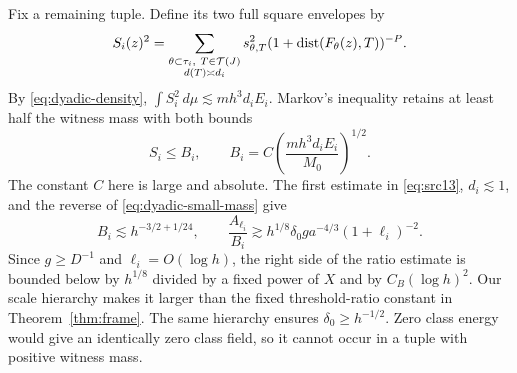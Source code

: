 Fix a remaining tuple.  Define its two full square envelopes by
\[
 S_i(z)^2=
 \sum_{\substack{\theta\subset\tau_i,\ T\in\mathcal T(J)\\
                         d(T)\asymp d_i}}
 s_{\theta,T}^2(1+\operatorname{dist}(F_\theta(z),T))^{-P}.
\]
By \eqref{eq:dyadic-density},
$\int S_i^2\,d\mu\lesssim mh^3d_iE_i$.  Markov's inequality retains
at least half the witness mass with both bounds
\begin{equation}\label{eq:dyadic-markov}
 S_i\leq B_i,
 \qquad B_i=C\left(\frac{mh^3d_iE_i}{M_0}\right)^{1/2}.
\end{equation}
The constant $C$ here is large and absolute.  The first estimate in
\eqref{eq:src13}, $d_i\lesssim1$, and the reverse of
\eqref{eq:dyadic-small-mass} give
\begin{equation}\label{eq:dyadic-ratios}
 B_i\lesssim h^{-3/2+1/24},\qquad
 \frac{A_{\ell_i}}{B_i}
 \gtrsim h^{1/8}\delta_0g a^{-4/3}(1+\ell_i)^{-2}.
\end{equation}
Since $g\geq D^{-1}$ and $\ell_i=O(\log h)$, the right side of the
ratio estimate is bounded below by $h^{1/8}$ divided by a fixed power
of $X$ and by $C_B(\log h)^2$.  Our scale hierarchy makes it larger
than the fixed threshold-ratio constant in Theorem~\ref{thm:frame}.
The same hierarchy ensures $\delta_0\geq h^{-1/2}$.  Zero class energy
would give an identically zero class field, so it cannot occur in a
tuple with positive witness mass.

